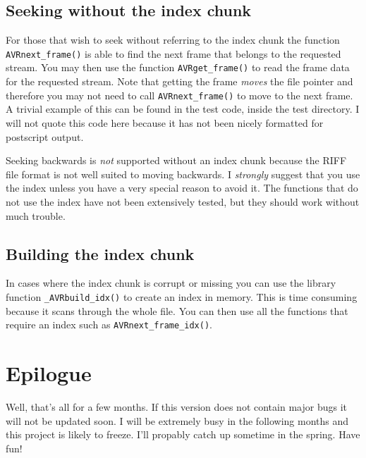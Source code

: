 \documentclass[12pt, a4paper]{article}
\begin{document}
\subsection{Seeking without the index chunk}
For those that wish to seek without referring to the index chunk the function
\verb+AVRnext_frame()+ is able to find the next frame that belongs to the
requested stream. You may then use the function \verb+AVRget_frame()+ to read
the frame data for the requested stream. Note that getting the frame \emph{moves} 
the file pointer and therefore you may not need to call \verb+AVRnext_frame()+ 
to move to the next frame. A trivial example of this can be found in the
test code, inside the test directory. I will not quote this code here
because it has not been nicely formatted for postscript output.

%

Seeking
backwards is \emph{not} supported without an index chunk because the 
{\kapitalakia RIFF} file format is not well suited to moving backwards. 
I \emph{strongly} suggest
that you use the index unless you have a very special reason to avoid it.
The functions that do not use the index have not been extensively tested, but they should work
without much trouble.

\subsection{Building the index chunk}
In cases where the index chunk is corrupt or missing you can use the library
function \verb+_AVRbuild_idx()+ to create an index in memory. This is time
consuming because it scans through the whole file. You can then use
all the functions that require an index such as \verb+AVRnext_frame_idx()+.


\section{Epilogue}
Well, that's all for a few months. If this version does not contain major
bugs it will not be updated soon. I will be extremely busy in the following
months and this project is likely to freeze. I'll propably catch up sometime
in the spring. Have fun!
\end{document}
